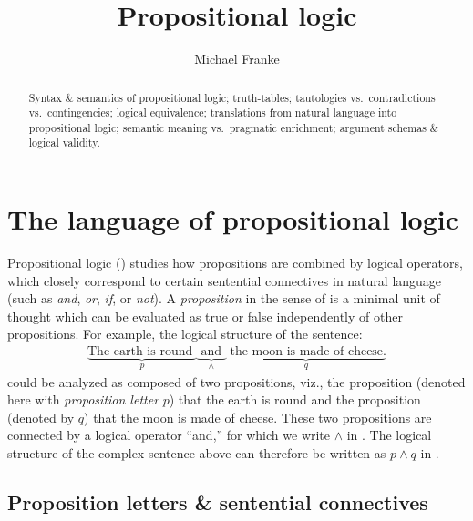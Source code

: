 \documentclass[nobib,nofonts]{tufte-handout}
\title{Propositional logic}
\author[M.~Franke]{Michael Franke}
\date{} %
\newcommand{\proplog}{\acro{PropLog}}
\begin{document}
\maketitle

\begin{abstract}
\noindent
Syntax \& semantics of propositional logic; truth-tables; tautologies vs.~contradictions vs.~contingencies; logical equivalence; translations from natural language into propositional logic; semantic meaning vs.~pragmatic enrichment; argument schemas \& logical validity.
\end{abstract}

\section{The language of propositional logic}

Propositional logic (\proplog) studies how propositions are combined by logical operators, which closely correspond to certain sentential connectives in natural language (such as \emph{and}, \emph{or}, \emph{if}, or \emph{not}).
A \textit{proposition} in the sense of \proplog is a minimal unit of thought which can be evaluated as true or false independently of other propositions.
For example, the logical structure of the sentence:
%
\begin{align*}
  \underbrace{\text{The earth is round }}_{p}
  \underbrace{\text{ and }}_{\wedge}
  \underbrace{\text{ the moon is made of cheese.}}_{q}
\end{align*}
%
could be analyzed as composed of two propositions, viz., the proposition (denoted here with \emph{proposition letter} $p$) that the earth is round and the proposition (denoted by $q$) that the moon is made of cheese.
These two propositions are connected by a logical operator ``and,'' for which we write $\wedge$ in \proplog.
The logical structure of the complex sentence above can therefore be written as $p \wedge q$ in \proplog.

\subsection{Proposition letters \& sentential connectives}
\end{document}
